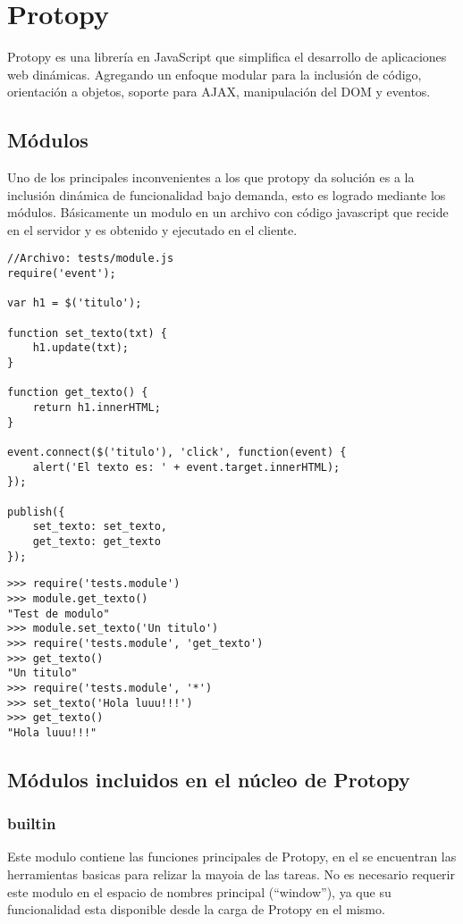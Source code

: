 \chapter{Protopy}
Protopy es una librería en JavaScript que simplifica el desarrollo de
aplicaciones web dinámicas.
Agregando un enfoque modular para la inclusión de código, orientación a objetos,
soporte para AJAX, manipulación del DOM y eventos.

\section{Módulos}
Uno de los principales inconvenientes a los que protopy da solución es a la
inclusión dinámica de funcionalidad bajo demanda,
esto es logrado mediante los módulos.
Básicamente un modulo en un archivo con código javascript que recide en el
servidor y es obtenido y ejecutado en el cliente.

\begin{lstlisting}[style=javascript,label=estructura-modulo,caption=Estructura
de un modulo]
//Archivo: tests/module.js
require('event');

var h1 = $('titulo');

function set_texto(txt) {
    h1.update(txt);
}

function get_texto() {
    return h1.innerHTML;
}

event.connect($('titulo'), 'click', function(event) {
    alert('El texto es: ' + event.target.innerHTML);
});

publish({
    set_texto: set_texto,
    get_texto: get_texto
});
\end{lstlisting}

\begin{lstlisting}[style=consola]
>>> require('tests.module')
>>> module.get_texto()
"Test de modulo"
>>> module.set_texto('Un titulo')
>>> require('tests.module', 'get_texto')
>>> get_texto()
"Un titulo"
>>> require('tests.module', '*')
>>> set_texto('Hola luuu!!!')
>>> get_texto()
"Hola luuu!!!"
\end{lstlisting}

\section{Módulos incluidos en el núcleo de Protopy}
\subsection{builtin}
Este modulo contiene las funciones principales de Protopy, en el se encuentran
las herramientas basicas para relizar la mayoia de las tareas.
No es necesario requerir este modulo en el espacio de nombres principal
(``window''), ya que su funcionalidad esta disponible desde la carga de Protopy
en el mismo.

